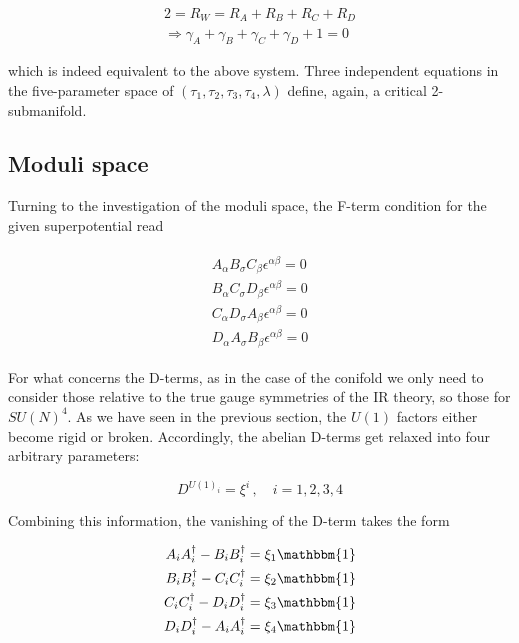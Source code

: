 \begin{equation}
	\begin{split}
	2 = R_W = R_A + R_B + R_C + R_D \\\Rightarrow \gamma_A + \gamma_B + \gamma_C + \gamma_D + 1 = 0
	\label{}
\end{split}
\end{equation}

which is indeed equivalent to the above system. Three independent equations in the five-parameter space of $(\tau_1,\tau_2,\tau_3,\tau_4,\lambda)$ define, again, a critical 2-submanifold.

\subsection{Moduli space}

Turning to the investigation of the moduli space, the F-term condition for the given superpotential read

\begin{align}
	\begin{split}
	A_\alpha B_\sigma C_\beta \epsilon^{\alpha\beta} = 0 \\
	B_\alpha C_\sigma D_\beta \epsilon^{\alpha\beta} = 0 \\
	C_\alpha D_\sigma A_\beta \epsilon^{\alpha\beta} = 0 \\
	D_\alpha A_\sigma B_\beta \epsilon^{\alpha\beta} = 0 
	\label{Ftermssquare}
\end{split}
\end{align}

For what concerns the D-terms, as in the case of the conifold we only need to consider those relative to the true gauge symmetries of the IR theory, so those for $SU(N)^4$. As we have seen in the previous section, the $U(1)$ factors either become rigid or broken. Accordingly, the abelian D-terms get relaxed into four arbitrary parameters:

\begin{equation}
	D^{U(1)_i} = \xi^i\,,\quad i = 1,2,3,4
	\label{}
\end{equation}

Combining this information, the vanishing of the D-term takes the form

\begin{align}
	\begin{split}
		A_i A^\dagger_i - B_i B^\dagger_i = \xi_1 \mathbbm{1} \\
		B_i B^\dagger_i - C_i C^\dagger_i = \xi_2 \mathbbm{1} \\
		C_i C^\dagger_i - D_i D^\dagger_i = \xi_3 \mathbbm{1} \\
		D_i D^\dagger_i - A_i A^\dagger_i = \xi_4 \mathbbm{1}
	\end{split}
	\label{Dtermssquare}
\end{align}

